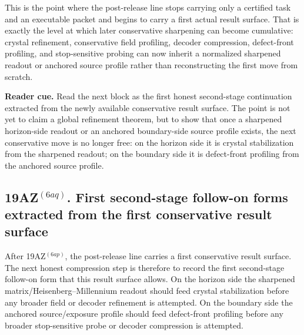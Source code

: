 \begin{remark}
\label{rem:what-the-first-conservative-result-form-now-buys}
This is the point where the post-release line stops carrying only a certified task and an executable packet and begins to carry a first actual result surface. That is exactly the level at which later conservative sharpening can become cumulative: crystal refinement, conservative field profiling, decoder compression, defect-front profiling, and stop-sensitive probing can now inherit a normalized sharpened readout or anchored source profile rather than reconstructing the first move from scratch.
\end{remark}



\noindent\textbf{Reader cue.} Read the next block as the first honest second-stage continuation extracted from the newly available conservative result surface. The point is not yet to claim a global refinement theorem, but to show that once a sharpened horizon-side readout or an anchored boundary-side source profile exists, the next conservative move is no longer free: on the horizon side it is crystal stabilization from the sharpened readout; on the boundary side it is defect-front profiling from the anchored source profile.

\subsection*{19AZ$^{(6aq)}$. First second-stage follow-on forms extracted from the first conservative result surface}
\label{sec:first-second-stage-follow-on-forms-extracted-from-the-first-conservative-result-surface}
After 19AZ$^{(6ap)}$, the post-release line carries a first conservative result surface. The next honest compression step is therefore to record the first second-stage follow-on form that this result surface allows. On the horizon side the sharpened matrix/Heisenberg--Millennium readout should feed crystal stabilization before any broader field or decoder refinement is attempted. On the boundary side the anchored source/exposure profile should feed defect-front profiling before any broader stop-sensitive probe or decoder compression is attempted.

